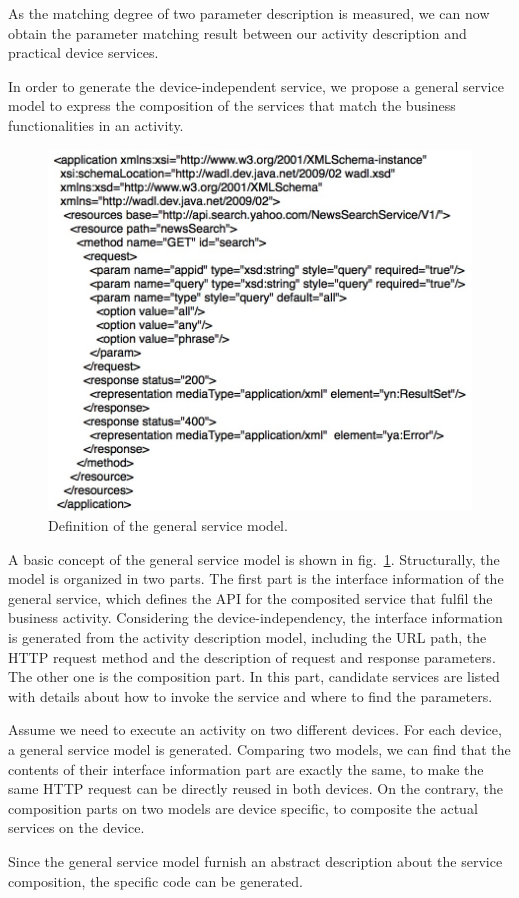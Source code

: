 As the matching degree of two parameter description is measured, we can now obtain the parameter matching result between our activity description and practical device services. 

In order to generate the device-independent service, we propose a general service model to express the composition of the services that match the business functionalities in an activity. 

\begin{figure}[!t]
\centering
\includegraphics[width=1.0\linewidth]{./graph/wadl}
\caption{Definition of the general service model.}
\label{fig_wadl}
\end{figure}

A basic concept of the general service model is shown in fig.~\ref{fig_wadl}. Structurally, the model is organized in two parts. The first part is the interface information of the general service, which defines the API for the composited service that fulfil the business activity. Considering the device-independency, the interface information is generated from the activity description model, including the URL path, the HTTP request method and the description of request and response parameters. The other one is the composition part. In this part, candidate services are listed with details about how to invoke the service and where to find the parameters. 

Assume we need to execute an activity on two different devices. For each device, a general service model is generated. Comparing two models, we can find that the contents of their interface information part are exactly the same, to make the same HTTP request can be directly reused in both devices. On the contrary, the composition parts on two models are device specific, to composite the actual services on the device. 

Since the general service model furnish an abstract description about the service composition, the specific code can be generated. 




